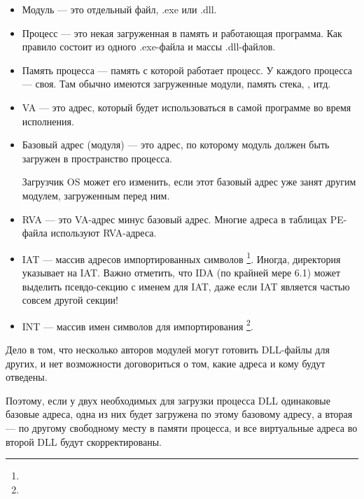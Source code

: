 \begin{itemize}
\item
Модуль --- это отдельный файл, .exe или .dll.

\item Процесс --- это некая загруженная в память и работающая программа.
Как правило состоит из одного .exe-файла и массы .dll-файлов.

\item Память процесса --- память с которой работает процесс.
У каждого процесса --- своя.
Там обычно имеются загруженные модули, память стека, , итд.

\item
{}
\ac{VA} --- это адрес, который будет использоваться в самой программе во время исполнения.

\item
{}
Базовый адрес (модуля) --- это адрес, по которому модуль должен быть загружен в пространство процесса.

Загрузчик \ac{OS} может его изменить, если этот базовый адрес уже занят другим модулем, загруженным перед ним.

\item
{}
\ac{RVA} --- это \ac{VA}-адрес минус базовый адрес. Многие адреса в таблицах PE-файла используют \ac{RVA}-адреса.


\item 
{}
\ac{IAT} --- массив адресов импортированных символов \footnote{\PietrekPE}. 
Иногда, директория  указывает на \ac{IAT}. 
\label{IDA_idata} Важно отметить, что \ac{IDA} (по крайней мере 6.1) может выделить псевдо-секцию с именем  для \ac{IAT}, даже если \ac{IAT} является частью совсем другой секции!

\item 
{}
\ac{INT} --- массив имен символов для импортирования \footnote{\PietrekPE}.
\end{itemize}


Дело в том, что несколько авторов модулей могут готовить DLL-файлы для других, и нет возможности договориться о том, какие адреса и кому будут отведены.

Поэтому, если у двух необходимых для загрузки процесса DLL одинаковые базовые адреса,
одна из них будет загружена по этому базовому адресу, 
а вторая --- по другому свободному месту в памяти процесса, и все виртуальные адреса во второй DLL будут скорректированы.

